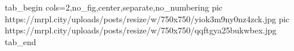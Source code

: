  
 
 
 
 

\ifcmt
  tab_begin cols=2,no_fig,center,separate,no_numbering
  	pic https://mrpl.city/uploads/posts/resize/w/750x750/yiok3m9ny0nz4zck.jpg
  	pic https://mrpl.city/uploads/posts/resize/w/750x750/qqftgya25bukwbex.jpg
  tab_end
\fi

